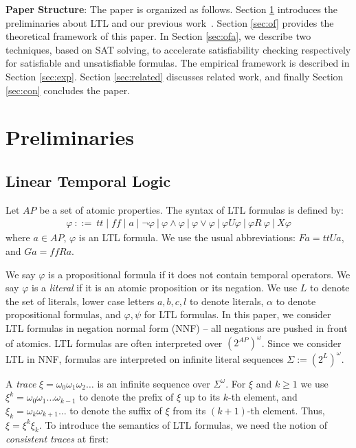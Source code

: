 \documentclass[conference]{IEEEtran}
\def\phi{\varphi}
\def\ff{\mathit{ff}}
\def\tt{\mathit{tt}}
\begin{document}
\noindent
\textbf{Paper Structure}: The paper is organized as
follows. Section \ref{sec:pre} introduces the preliminaries about LTL and our
previous work~\cite{LZPVH13}. Section \ref{sec:of} provides the theoretical
framework of this paper. In Section \ref{sec:ofa}, we describe two techniques, 
based on SAT solving, to accelerate satisfiability checking respectively for
satisfiable and unsatisfiable formulas. The empirical framework
is described in Section \ref{sec:exp}. Section \ref{sec:related} discusses 
related work, and finally Section \ref{sec:con} concludes the paper.
\section{Preliminaries}\label{sec:pre}
\subsection{Linear Temporal Logic}\label{sec:ltl}
Let $AP$ be a set of atomic properties. 
The syntax of LTL formulas is defined by:
\begin{align*}
\phi\ ::=\ \tt \mid \ff\mid a \mid \neg \phi \ |\ \phi\wedge \phi\ |\ \phi\vee \phi\ |\ \phi U \phi\ |\ \phi R\ \phi\ |\ X \phi
\end{align*}
where $a\in AP$, $\phi$ is an LTL formula.  We use the usual
abbreviations: 
$Fa=\tt Ua$, and $Ga=\ff Ra$. 

We say $\phi$ is a propositional formula if it does not contain
temporal operators. We say $\phi$ is a \emph{literal}
if it is an atomic proposition or its negation.  We use $L$ to denote
the set of literals, lower case letters $a,b,c,l$ to denote
literals, $\alpha$ to denote propositional
formulas, and $\phi, \psi$ for LTL formulas.  
In this paper, we consider LTL formulas in negation normal form (NNF) -- all negations are 
pushed in front of atomics. 
LTL formulas are often interpreted over $(2^{AP})^\omega$. Since we consider LTL in NNF, formulas are interpreted on infinite literal sequences
$\Sigma:= (2^L)^\omega$. 


A \emph{trace} $\xi=\omega_0\omega_1\omega_2\ldots$ is an infinite sequence over
$\Sigma^\omega$. For $\xi$ and $k\geq 1$ we use $\xi ^k=\omega_0\omega_1\ldots
\omega_{k-1}$ to denote the prefix of $\xi$ up to its $k$-th element,
and $\xi _k =\omega_k\omega_{k+1}\ldots$ to denote the suffix of $\xi$
from its $(k+1)$-th element.  Thus, $\xi=\xi^k \xi_k$. 
\iffalse
To introduce the semantics of LTL formulas, we need the notion of \emph{consistent traces} 
at first:
\end{document}
